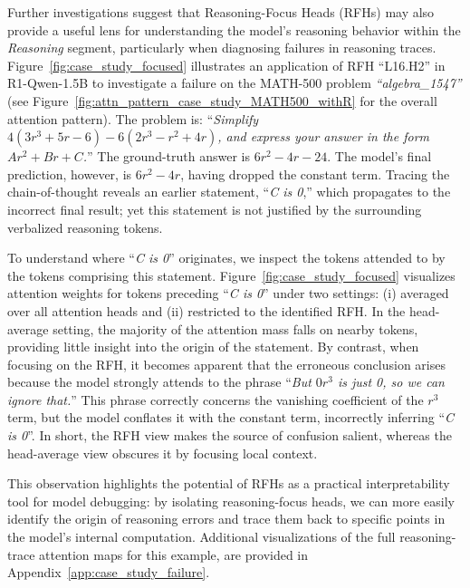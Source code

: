 \documentclass[11pt]{article}
\begin{document}
Further investigations suggest that Reasoning-Focus Heads (RFHs) may also provide a useful lens for understanding the model’s reasoning behavior within the \textit{Reasoning} segment, particularly when diagnosing failures in reasoning traces. Figure~\ref{fig:case_study_focused} illustrates an application of RFH ``L16.H2'' in R1-Qwen-1.5B to investigate a failure on the MATH-500 problem \textit{``algebra\_1547''} (see Figure~\ref{fig:attn_pattern_case_study_MATH500_withR} for the overall attention pattern). The problem is: ``\textit{Simplify $4(3r^3+5r-6)-6(2r^3-r^2+4r)$, and express your answer in the form $Ar^2 + Br + C$.}'' The ground-truth answer is $6r^2 - 4r - 24$. The model’s final prediction, however, is $6r^2 - 4r$, having dropped the constant term. Tracing the chain-of-thought reveals an earlier statement, ``\textit{C is 0},'' which propagates to the incorrect final result; yet this statement is not justified by the surrounding verbalized reasoning tokens.

To understand where ``\textit{C is 0}'' originates, we inspect the tokens attended to by the tokens comprising this statement. Figure~\ref{fig:case_study_focused} visualizes attention weights for tokens preceding ``\textit{C is 0}'' under two settings: (i) averaged over all attention heads and (ii) restricted to the identified RFH. In the head-average setting, the majority of the attention mass falls on nearby tokens, providing little insight into the origin of the statement. By contrast, when focusing on the RFH, it becomes apparent that the erroneous conclusion arises because the model strongly attends to the phrase ``\textit{But $0r^3$ is just 0, so we can ignore that.}'' This phrase correctly concerns the vanishing coefficient of the $r^3$ term, but the model conflates it with the constant term, incorrectly inferring ``\textit{C is 0}''. In short, the RFH view makes the source of confusion salient, whereas the head-average view obscures it by focusing local context. 

This observation highlights the potential of RFHs as a practical interpretability tool for model debugging: by isolating reasoning-focus heads, we can more easily identify the origin of reasoning errors and trace them back to specific points in the model’s internal computation. Additional visualizations of the full reasoning-trace attention maps for this example, are provided in Appendix~\ref{app:case_study_failure}.
\end{document}
